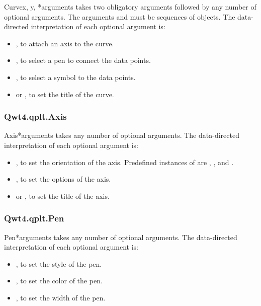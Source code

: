 \documentclass{manual}
\newcommand{\Download}{\ulink{download}
  {http://pyqwt.sourceforge.net/download.html}}
\newcommand{\Future}{
  \begin{notice}[warning]
    The documentation is for the future PyQwt-4.2.2 which is only available
    from CVS. The \Download{} page has links for the latest releases.
  \end{notice}
}
\renewcommand{\Future}{}
\begin{document}
\Future{}

\begin{classdesc}{Curve}{x, y, *arguments}
   takes two obligatory arguments followed by any number of
  optional arguments. The arguments  and  must be sequences
  of  objects.
  The data-directed interpretation of each optional argument is:
  \begin{itemize}
  \item
    , to attach an axis to the curve.
  \item
    , to select a pen to connect the data points.
  \item
    , to select a symbol to the data points.
  \item
     or , to set the title of the curve.
  \end{itemize}
\end{classdesc}

\subsubsection{Qwt4.qplt.Axis \label{intro-qplt-axis}}

\Future{}

\begin{classdesc}{Axis}{*arguments}
   takes any number of optional arguments.
  The data-directed interpretation of each optional argument is:
  \begin{itemize}
  \item
    , to set the orientation of the axis.  Predefined
    instances of  are , ,
     and .
  \item
    , to set the options of the axis.
  \item
     or , to set the title of the axis.
  \end{itemize}
\end{classdesc}

\subsubsection{Qwt4.qplt.Pen \label{intro-qplt-pen}}

\Future{}

\begin{classdesc}{Pen}{*arguments}
   takes any number of optional arguments.
  The data-directed interpretation of each optional argument is:
  \begin{itemize}
  \item
    , to set the style of the pen.
  \item
    , to set the color of the pen.
  \item
    , to set the width of the pen.
  \end{itemize}
\end{classdesc}
\end{document}
